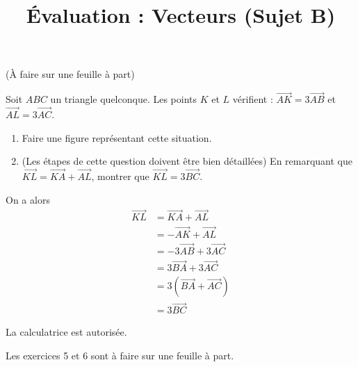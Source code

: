 \documentclass[
	classe=$2^{de}$
]{évaluation}
\begin{document}
\begin{exercice}(À faire sur une feuille à part)

	Soit $ABC$ un triangle quelconque. Les points $K$ et $L$ vérifient : $\vec{AK} = 3\vec{AB}$ et $\vec{AL} = 3\vec{AC}$.
	\begin{enumerate}
		\item Faire une figure représentant cette situation.
		\item (Les étapes de cette question doivent être bien détaillées) En remarquant que $\vec{KL} = \vec{KA} + \vec{AL}$, montrer que $\vec{KL} = 3\vec{BC}$.
	\end{enumerate}

	\ifdefined\makeCorrection
		\begin{center}
		\end{center}

		{\color{red}
		On a alors
		\begin{align*}
			\vec{KL} & = \vec{KA} + \vec{AL}    \\
			         & = -\vec{AK} + \vec{AL}   \\
			         & = -3\vec{AB} + 3\vec{AC} \\
			         & = 3\vec{BA} + 3\vec{AC}  \\
			         & = 3(\vec{BA} + \vec{AC}) \\
			         & = 3\vec{BC}
		\end{align*}
		}
	\fi
\end{exercice}


\setcounter{exercice}{1}
\newpage

\title{Évaluation : Vecteurs (Sujet B)}
\maketitle

\begin{tcolorbox}
	La calculatrice est autorisée.

	Les exercices 5 et 6 sont à faire sur une feuille à part.
\end{tcolorbox}
\end{document}
